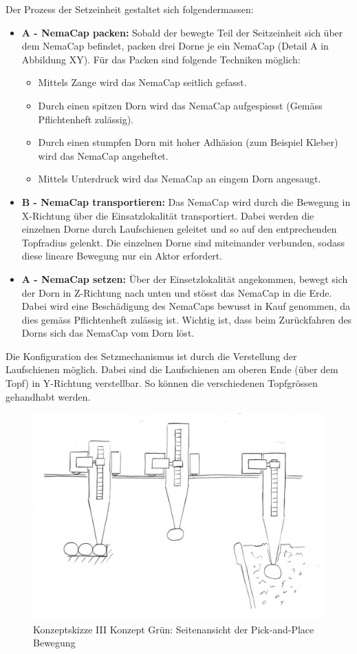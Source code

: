 Der Prozess der Setzeinheit gestaltet sich folgendermassen:
\begin{itemize}
	\item \textbf{A - NemaCap packen:} Sobald der bewegte Teil der Seitzeinheit sich über dem NemaCap befindet, packen drei Dorne je ein NemaCap (Detail A in Abbildung XY). Für das Packen sind folgende Techniken möglich:
	\begin{itemize}
		\item Mittels Zange wird das NemaCap seitlich gefasst.
		\item Durch einen spitzen Dorn wird das NemaCap aufgespiesst (Gemäss Pflichtenheft zulässig).
		\item Durch einen stumpfen Dorn mit hoher Adhäsion (zum Beispiel Kleber) wird das NemaCap angeheftet.
		\item Mittels Unterdruck wird das NemaCap an eingem Dorn angesaugt.
	\end{itemize} 
	\item \textbf{B - NemaCap transportieren:} Das NemaCap wird durch die Bewegung in X-Richtung über die Einsatzlokalität transportiert. Dabei werden die einzelnen Dorne durch Laufschienen geleitet und so auf den entprechenden Topfradius gelenkt. Die einzelnen Dorne sind miteinander verbunden, sodass diese lineare Bewegung nur ein Aktor erfordert.
	\item \textbf{A - NemaCap setzen:} 
	Über der Einsetzlokalität angekommen, bewegt sich der Dorn in Z-Richtung nach unten und stösst das NemaCap in die Erde. Dabei wird eine Beschädigung des NemaCaps bewusst in Kauf genommen, da dies gemäss Pflichtenheft zulässig ist. Wichtig ist, dass beim Zurückfahren des Dorns sich das NemaCap vom Dorn löst.
\end{itemize}
Die Konfiguration des Setzmechanismus ist durch die Verstellung der Laufschienen möglich. Dabei sind die Laufschienen am oberen Ende (über dem Topf) in Y-Richtung verstellbar. So können die verschiedenen Topfgrössen gehandhabt werden.

\begin{figure}[H]
	\includegraphics[scale=0.6]{Illustrationen/5-Konzept/green_2Dmachine_seite.jpg}
	\caption{Konzeptskizze III Konzept Grün: Seitenansicht der Pick-and-Place Bewegung}
	\label{fig:transport_green_side}
\end{figure}